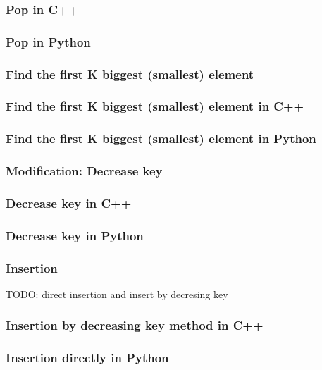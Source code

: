 \documentclass{article}
\begin{document}
\subsubsection*{Pop in C++}

\subsubsection*{Pop in Python}

\subsubsection{Find the first K biggest (smallest) element}

\subsubsection*{Find the first K biggest (smallest) element in C++}

\subsubsection*{Find the first K biggest (smallest) element in Python}

\subsubsection{Modification: Decrease key}

\subsubsection*{Decrease key in C++}

\subsubsection*{Decrease key in Python}

\subsubsection{Insertion}

TODO: direct insertion and insert by decresing key

\subsubsection*{Insertion by decreasing key method in C++}

\subsubsection*{Insertion directly in Python}
\end{document}
